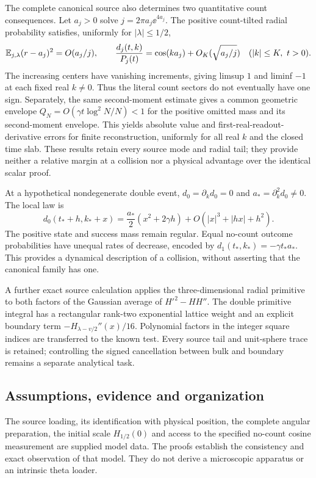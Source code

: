 The complete canonical source also determines two quantitative count
consequences. Let $a_j>0$ solve $j=2\pi a_j\ee^{4a_j}$. The positive
count-tilted radial probability satisfies, uniformly for
$|\lambda|\le1/2$,
\[
 \mathbb E_{j,\lambda}(r-a_j)^2=O(a_j/j),\qquad
 \frac{d_j(t,k)}{P_j(t)}=\cos(ka_j)+O_K(\sqrt{a_j/j})
 \quad(|k|\le K,\ t>0).
\]
The increasing centers have vanishing increments, giving limsup $1$ and
liminf $-1$ at each fixed real $k\ne0$. Thus the literal count sectors do
not eventually have one sign. Separately, the same second-moment estimate
gives a common geometric envelope $Q_N=O(\gamma t\log^2N/N)<1$ for the
positive omitted mass and its second-moment envelope. This yields absolute
value and first-real-readout-derivative errors for finite reconstruction,
uniformly for all real $k$ and the closed time slab. These results retain
every source mode and radial tail; they provide neither a relative margin
at a collision nor a physical advantage over the identical scalar proof.

At a hypothetical nondegenerate double event,
$d_0=\partial_kd_0=0$ and $a_*=\partial_k^2d_0\ne0$. The local law is
\begin{equation}\label{eq:foldintro}
 d_0(t_*+h,k_*+x)=\frac{a_*}{2}(x^2+2\gamma h)
                      +O(|x|^3+|hx|+h^2).
\end{equation}
The positive state and success mass remain regular. Equal no-count outcome
probabilities have unequal rates of decrease, encoded by
$d_1(t_*,k_*)=-\gamma t_*a_*$. This provides a dynamical description of a
collision, without asserting that the canonical family has one.

A further exact source calculation applies the three-dimensional radial
primitive to both factors of the Gaussian average of $H'^2-HH''$.
The double primitive integral has a rectangular rank-two exponential
lattice weight and an explicit boundary term
$-H_{\lambda-v/2}''(x)/16$. Polynomial factors in the integer square
indices are transferred to the known test. Every source tail and
unit-sphere trace is retained; controlling the signed cancellation
between bulk and boundary remains a separate analytical task.

\subsection{Assumptions, evidence and organization}
The source loading, its identification with physical position, the complete
angular preparation, the initial scale $H_{1/2}(0)$ and access to the
specified no-count cosine measurement are supplied model data. The proofs
establish the consistency and exact observation of that model. They do not
derive a microscopic apparatus or an intrinsic theta loader.

